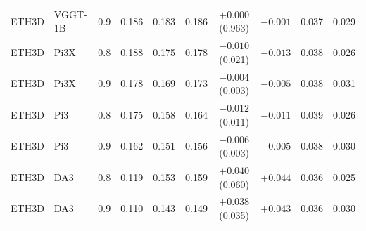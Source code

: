 \begin{tabular}{llrccccccc}
ETH3D & VGGT-1B & 0.9 & 0.186 & 0.183 & 0.186 & $+0.000$ (0.963) & $-0.001$ & 0.037 & 0.029 \\
ETH3D & Pi3X & 0.8 & 0.188 & 0.175 & 0.178 & $-0.010$ (0.021) & $-0.013$ & 0.038 & 0.026 \\
ETH3D & Pi3X & 0.9 & 0.178 & 0.169 & 0.173 & $-0.004$ (0.003) & $-0.005$ & 0.038 & 0.031 \\
ETH3D & Pi3 & 0.8 & 0.175 & 0.158 & 0.164 & $-0.012$ (0.011) & $-0.011$ & 0.039 & 0.026 \\
ETH3D & Pi3 & 0.9 & 0.162 & 0.151 & 0.156 & $-0.006$ (0.003) & $-0.005$ & 0.038 & 0.030 \\
ETH3D & DA3 & 0.8 & 0.119 & 0.153 & 0.159 & $+0.040$ (0.060) & $+0.044$ & 0.036 & 0.025 \\
ETH3D & DA3 & 0.9 & 0.110 & 0.143 & 0.149 & $+0.038$ (0.035) & $+0.043$ & 0.036 & 0.030 \\
\bottomrule
\end{tabular}
